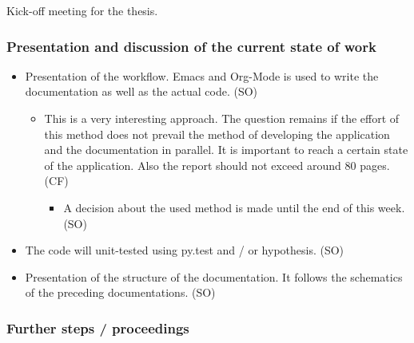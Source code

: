 \documentclass[10pt, openright, notitlepage]{scrreprt}
\begin{document}
Kick-off meeting for the thesis.

\subsubsection{Presentation and discussion of the current state of work}
\label{sec:org9d2e2da}

\begin{itemize}
\item Presentation of the workflow. Emacs and Org-Mode is used to write the
documentation as well as the actual code. (SO)
\begin{itemize}
\item This is a very interesting approach. The question remains if the effort of
this method does not prevail the method of developing the application and
the documentation in parallel. It is important to reach a certain state of
the application. Also the report should not exceed around 80 pages. (CF)
\begin{itemize}
\item A decision about the used method is made until the end of this week. (SO)
\end{itemize}
\end{itemize}
\item The code will unit-tested using py.test and / or hypothesis. (SO)
\item Presentation of the structure of the documentation. It follows the schematics
of the preceding documentations. (SO)
\end{itemize}

\subsubsection{Further steps / proceedings}
\label{sec:org9722dc4}
\end{document}
